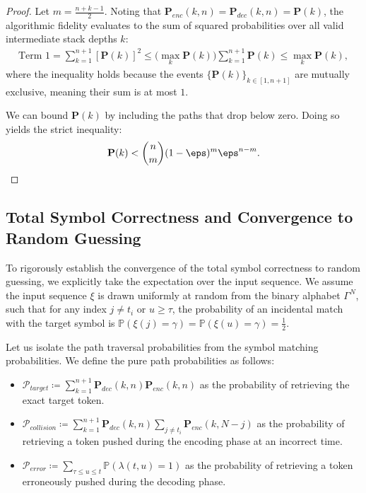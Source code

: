 \documentclass[10pt]{article} %
\begin{document}
\begin{proof}
Let $m = \frac{n+k-1}{2}$. Noting that $\mathbf{P}_{enc}(k, n) = \mathbf{P}_{dec}(k, n) = \mathbf{P}(k)$, the algorithmic fidelity evaluates to the sum of squared probabilities over all valid intermediate stack depths $k$:
\begin{align*}
    \text{Term 1} = \sum_{k=1}^{n+1} [\mathbf{P}(k)]^2 \leq \big(\max_k \mathbf{P}(k)\big) \sum_{k=1}^{n+1} \mathbf{P}(k) \leq \max_k \mathbf{P}(k),
\end{align*}
where the inequality holds because the events $\{\mathbf{P}(k)\}_{k \in [1,n+1]}$ are mutually exclusive, meaning their sum is at most $1$. 

We can bound $\mathbf{P}(k)$ by including the paths that drop below zero. Doing so yields the strict inequality:
$$
\mathbf{P}(k) < \binom{n}{m} (1-\eps)^m \eps^{n-m}.
$$

\end{proof}

\subsection{Total Symbol Correctness and Convergence to Random Guessing}

To rigorously establish the convergence of the total symbol correctness to random guessing, we explicitly take the expectation over the input sequence. We assume the input sequence $\xi$ is drawn uniformly at random from the binary alphabet $\Gamma^N$, such that for any index $j \neq t_i$ or $u \geq \tau$, the probability of an incidental match with the target symbol is $\mathbb{P}(\xi(j) = \gamma) = \mathbb{P}(\xi(u) = \gamma) = \frac{1}{2}$.

Let us isolate the path traversal probabilities from the symbol matching probabilities. We define the pure path probabilities as follows:
\begin{itemize}
    \item $\mathcal{P}_{target} \coloneqq \sum_{k=1}^{n+1} \mathbf{P}_{dec}(k, n) \mathbf{P}_{enc}(k, n)$ as the probability of retrieving the exact target token.
    \item $\mathcal{P}_{collision} \coloneqq \sum_{k=1}^{n+1} \mathbf{P}_{dec}(k, n) \sum_{j \neq t_i} \mathbf{P}_{enc}(k, N-j)$ as the probability of retrieving a token pushed during the encoding phase at an incorrect time.
    \item $\mathcal{P}_{error} \coloneqq \sum_{\tau \leq u \leq t} \mathbb{P}(\lambda(t,u) = 1)$ as the probability of retrieving a token erroneously pushed during the decoding phase.
\end{itemize}
\end{document}
